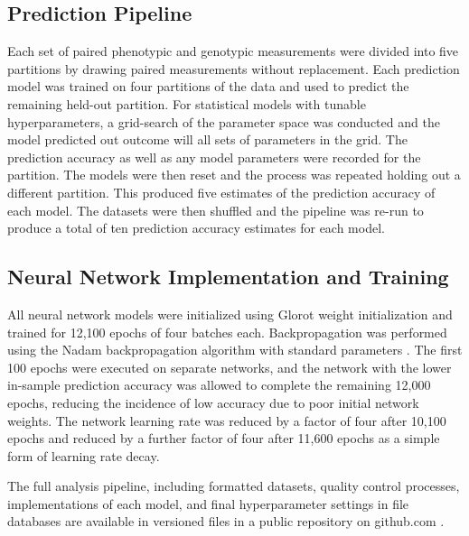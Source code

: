 \subsection*{Prediction Pipeline}


Each set of paired phenotypic and genotypic measurements were divided into 
five partitions by drawing paired measurements without replacement. Each prediction model
was trained on four partitions of the data and used to predict the remaining held-out partition. 
For statistical models with tunable hyperparameters, a grid-search of the parameter 
space was conducted and the model predicted out outcome will all sets of parameters in the grid.
The prediction accuracy as well as any model parameters were recorded for the partition. The models 
were then reset and the process was repeated holding out a different partition. This produced 
five estimates of the prediction accuracy of each model. The datasets were then shuffled 
and the pipeline was re-run to produce a total of ten prediction accuracy estimates for each model. 

\subsection*{Neural Network Implementation and Training}

All neural network models were initialized using Glorot weight initialization \citep{glorot2010} 
and trained for 12,100 epochs of four batches each. Backpropagation was performed using the 
Nadam backpropagation algorithm with standard parameters \citep{dozat2015}. 
The first 100 epochs were executed on separate networks, and the network with the lower 
in-sample prediction accuracy was allowed to complete the remaining 12,000 epochs, 
reducing the incidence of low accuracy due to poor initial network weights.
The network learning rate was reduced by a factor of four after 10,100 epochs and reduced by a further
factor of four after 11,600 epochs as a simple form of learning rate decay.

The full analysis pipeline, including formatted datasets, quality control processes, 
implementations of each model, and final hyperparameter settings in file databases 
are available in versioned files in a public repository on github.com \citep{mcdowell2016}.

